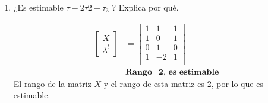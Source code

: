 \documentclass[10pt,a4paper]{report}
\begin{document}
\begin{enumerate}
\begin{enumerate}
Para $\tau_3$
\begin{align*}
\begin{bmatrix} X\\ \lambda^t\end{bmatrix} & =
\begin{bmatrix}
        1 &1 &1\\
        1 &0 &1\\
        0 &1 &0\\
        0 &0 &1\\
    \end{bmatrix} \\ &\textbf{Rango=3, no es estimable}
\end{align*}

\item ¿Es estimable ${\tau} - 2{\tau}{2} + {\tau}_{3}$ ? Explica por qué.

\begin{align*}
\begin{bmatrix} X\\ \lambda^t\end{bmatrix} & =
\begin{bmatrix}
        1 &1 &1\\
        1 &0 &1\\
        0 &1 &0\\
        1 &-2 &1\\
    \end{bmatrix} \\ &\textbf{Rango=2, es estimable}
\end{align*}
El rango de la matriz $X$ y el rango de esta matriz es 2, por lo que es estimable.
\end{enumerate}
\end{enumerate}
\end{document}
